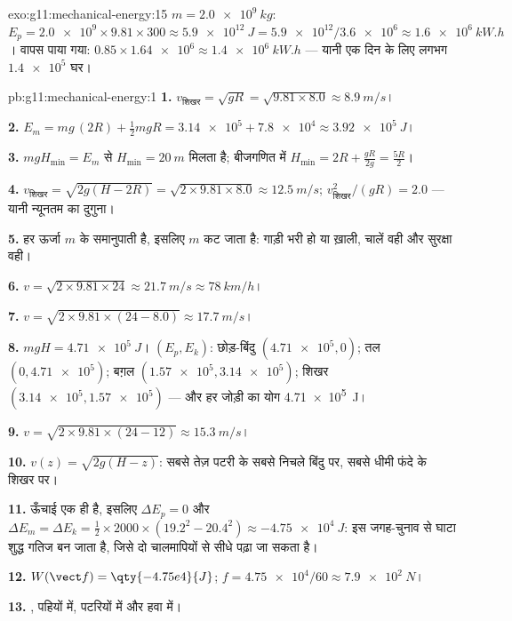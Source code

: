 \begin{solution}{exo:g11:mechanical-energy:15}
$m = \qty{2.0e9}{kg}$: $E_p = \num{2.0e9} \times 9.81 \times 300 \approx \qty{5.9e12}{J}
= \num{5.9e12}/\num{3.6e6} \approx \qty{1.6e6}{kW.h}$। वापस पाया गया: $0.85 \times \num{1.64e6} \approx \qty{1.4e6}{kW.h}$ --- यानी एक दिन के लिए लगभग $\num{1.4e5}$
घर।
\end{solution}

\begin{solution}{pb:g11:mechanical-energy:1}
\textbf{1.} $v_{\text{शिखर}} = \sqrt{gR} = \sqrt{9.81 \times 8.0}
\approx \qty{8.9}{m/s}$।

\textbf{2.} $E_m = mg\,(2R) + \tfrac12 m gR = \num{3.14e5} +
\num{7.8e4} \approx \qty{3.92e5}{J}$।

\textbf{3.} $mgH_{\min} = E_m$ से $H_{\min} = \qty{20}{m}$ मिलता है; बीजगणित में $H_{\min} = 2R + \frac{gR}{2g} = \frac{5R}{2}$।

\textbf{4.} $v_{\text{शिखर}} = \sqrt{2g(H - 2R)} =
\sqrt{2 \times 9.81 \times 8.0} \approx \qty{12.5}{m/s}$; $v_{\text{शिखर}}^2/(gR) = 2.0$ --- यानी न्यूनतम का दुगुना।

\textbf{5.} हर ऊर्जा $m$ के समानुपाती है, इसलिए $m$ कट जाता है:
गाड़ी भरी हो या ख़ाली, चालें वही और सुरक्षा वही।

\textbf{6.} $v = \sqrt{2 \times 9.81 \times 24} \approx \qty{21.7}{m/s}
\approx \qty{78}{km/h}$।

\textbf{7.} $v = \sqrt{2 \times 9.81 \times (24 - 8.0)} \approx
\qty{17.7}{m/s}$।

\textbf{8.} $mgH = \qty{4.71e5}{J}$। $(E_p, E_k)$: छोड़-बिंदु $(\num{4.71e5}, 0)$; तल $(0, \num{4.71e5})$; बग़ल $(\num{1.57e5}, \num{3.14e5})$; शिखर
$(\num{3.14e5}, \num{1.57e5})$ --- और हर जोड़ी का योग \qty{4.71e5}{J}।

\textbf{9.} $v = \sqrt{2 \times 9.81 \times (24 - 12)} \approx
\qty{15.3}{m/s}$।

\textbf{10.} $v(z) = \sqrt{2g(H - z)}$: सबसे तेज़ पटरी के सबसे निचले बिंदु पर, सबसे धीमी फंदे
के शिखर पर।

\textbf{11.} ऊँचाई एक ही है, इसलिए $\Delta E_p = 0$ और $\Delta E_m = \Delta E_k = \tfrac12 \times 2000 \times (19.2^2 -
20.4^2) \approx \qty{-4.75e4}{J}$: इस जगह-चुनाव से घाटा
शुद्ध गतिज बन जाता है, जिसे दो चालमापियों से सीधे पढ़ा जा सकता है।

\textbf{12.} $W(\vect f) = \qty{-4.75e4}{J}$; $f = \num{4.75e4}/60 \approx \qty{7.9e2}{N}$।

\textbf{13.} , पहियों में, पटरियों में और हवा में।


\end{solution}
